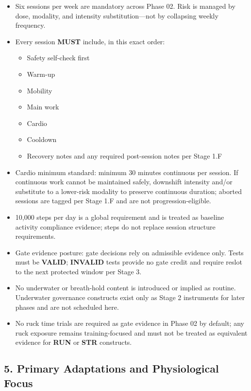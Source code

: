 \documentclass[10pt]{article}
\begin{document}
\begin{itemize}
\item Six sessions per week are mandatory across Phase 02. Risk is managed by dose, modality, and intensity substitution—not by collapsing weekly frequency.
\item Every session \textbf{MUST} include, in this exact order:
\begin{itemize}
\item Safety self-check first
\item Warm-up
\item Mobility
\item Main work
\item Cardio
\item Cooldown
\item Recovery notes and any required post-session notes per Stage 1.F
\end{itemize}
\item Cardio minimum standard: minimum 30 minutes continuous per session. If continuous work cannot be maintained safely, downshift intensity and/or substitute to a lower-risk modality to preserve continuous duration; aborted sessions are tagged per Stage 1.F and are not progression-eligible.
\item 10,000 steps per day is a global requirement and is treated as baseline activity compliance evidence; steps do not replace session structure requirements.
\item Gate evidence posture: gate decisions rely on admissible evidence only. Tests must be \textbf{VALID}; \textbf{INVALID} tests provide no gate credit and require reslot to the next protected window per Stage 3.
\item No underwater or breath-hold content is introduced or implied as routine. Underwater governance constructs exist only as Stage 2 instruments for later phases and are not scheduled here.
\item No ruck time trials are required as gate evidence in Phase 02 by default; any ruck exposure remains training-focused and must not be treated as equivalent evidence for \textbf{RUN} or \textbf{STR} constructs.
\end{itemize}

\subsection*{5. Primary Adaptations and Physiological Focus}
\end{document}
